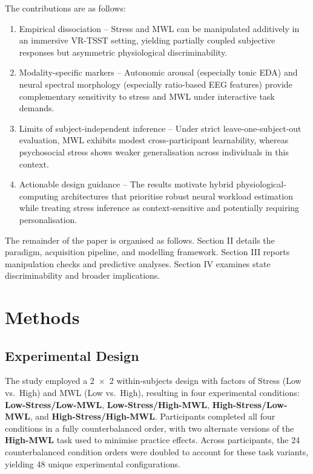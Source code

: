 \documentclass[lettersize,journal]{IEEEtran}
\begin{document}
The contributions are as follows:

\begin{enumerate}
\item Empirical dissociation – Stress and MWL can be manipulated additively in an immersive VR-TSST setting, yielding partially coupled subjective responses but asymmetric physiological discriminability.

\item Modality-specific markers – Autonomic arousal (especially tonic EDA) and neural spectral morphology (especially ratio-based EEG features) provide complementary sensitivity to stress and MWL under interactive task demands.

\item Limits of subject-independent inference – Under strict leave-one-subject-out evaluation, MWL exhibits modest cross-participant learnability, whereas psychosocial stress shows weaker generalisation across individuals in this context.

\item Actionable design guidance – The results motivate hybrid physiological-computing architectures that prioritise robust neural workload estimation while treating stress inference as context-sensitive and potentially requiring personalisation.

\end{enumerate}

The remainder of the paper is organised as follows. Section II details the paradigm, acquisition pipeline, and modelling framework. Section III reports manipulation checks and predictive analyses. Section IV examines state discriminability and broader implications.


\section{Methods}


\subsection{Experimental Design}
The study employed a 2~\(\times\)~2 within-subjects design with factors of Stress (Low vs.\ High) and MWL (Low vs.\ High), resulting in four experimental conditions: \textbf{Low-Stress/Low-MWL}, \textbf{Low-Stress/High-MWL}, 
\textbf{High-Stress/Low-MWL}, and \textbf{High-Stress/High-MWL}.
 Participants completed all four conditions in a fully counterbalanced order, with two alternate versions of the \textbf{High-MWL} task used to minimise practice effects. Across participants, the 24 counterbalanced condition orders were doubled to account for these task variants, yielding 48 unique experimental configurations.
\end{document}

